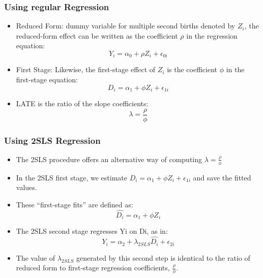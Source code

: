 \documentclass{beamer}
\begin{document}

\begin{frame}
\frametitle{Using regular Regression}

\begin{itemize}
	\item Reduced Form: dummy variable for multiple second births denoted by $Z_i$, the reduced-form
effect can be written as the coefficient $\rho$ in the regression equation: 
$$Y_i=\alpha_0 + \rho Z_i + \epsilon_{0i}$$
\item First Stage: Likewise, the first-stage effect of $Z_i$ is the coefficient $\phi$ in the first-stage equation: 
$$D_i=\alpha_1 + \phi Z_i + \epsilon_{1i}$$
\item LATE is the ratio of the slope coefficients: 
$$\lambda = \frac{\rho}{\phi}$$

\end{itemize}

\end{frame}


\begin{frame}
\frametitle{Using 2SLS Regression}

\begin{itemize}
	\item The 2SLS procedure offers an alternative way of computing $\lambda = \frac{\rho}{\phi}$
	\item In the 2SLS first stage, we estimate $D_i=\alpha_1 + \phi Z_i + \epsilon_{1i}$ and save the fitted values. 
	\item These “first-stage fits” are defined as: 
	$$\hat{D_i}=\alpha_1 + \phi Z_i $$
	\item The 2SLS second stage regresses Yi on Di, as in: 
	$$Y_i=\alpha_2+\lambda_{2SLS}\hat{D_i}+\epsilon_{2i}$$
	\item The value of $\lambda_{2SLS}$ generated by this second step is identical to the ratio of reduced form to first-stage regression coefficients, $\frac{\rho}{\phi}$.

\end{itemize}

\end{frame}
\end{document}
